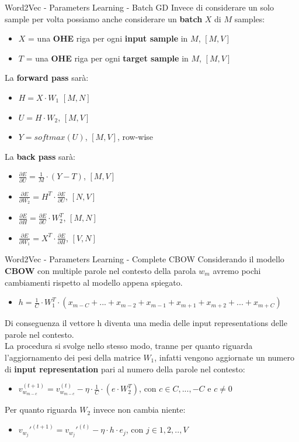 \documentclass[british]{beamer}
\begin{document}
\begin{frame}{Word2Vec - Parameters Learning - Batch GD}
	Invece di considerare un solo sample per volta possiamo anche considerare un \textbf{batch} \(X\) di \(M\) samples:
	\begin{itemize}
		\item \(X\) = una \textbf{OHE} riga per ogni \textbf{input sample} in \(M\), \([M,V]\)
		\item \(T\) = una \textbf{OHE} riga per ogni \textbf{target sample} in \(M\), \([M,V]\)
	\end{itemize}
	La \textbf{forward pass} sar\`{a}:
	\begin{itemize}
		\item \(H = X \cdot W_1\)  \([M,N]\)
		\item \(U = H \cdot W_2\),  \([M,V]\)
		\item \(Y = softmax(U)\),  \([M,V]\), row-wise
	\end{itemize}
	La \textbf{back pass} sar\`{a}:
	\begin{itemize}
		\item \( \frac{\partial E}{\partial U} = \frac{1}{M} \cdot \left( Y - T \right) \), \([M,V]\)
		\item \( \frac{\partial E}{\partial W_2} = H^T \cdot\frac{\partial E}{\partial U} \), \([N,V]\)
		\item \(\frac{\partial E}{\partial H} = \frac{\partial E}{\partial U} \cdot W_2^T \), \([M,N]\)
		\item \(\frac{\partial E}{\partial W_1} = X^T \cdot \frac{\partial E}{\partial H}\), \([V,N]\)
	\end{itemize}
\end{frame}

\begin{frame}{Word2Vec - Parameters Learning - Complete CBOW}
	Considerando il modello \textbf{CBOW} con multiple parole nel contesto della parola \(w_{m}\) avremo pochi cambiamenti rispetto al modello appena spiegato.
	\begin{itemize}
		\item \( h = \frac{1}{C} \cdot W_1^T \cdot \left(x_{m-C} + ... + x_{m-2} + x_{m-1} + x_{m+1} + x_{m+2} + ... + x_{m+C} \right)\)
	\end{itemize}
	Di conseguenza il vettore h diventa una media delle input representations delle parole nel contesto.\\
	La procedura si svolge nello stesso modo, tranne per quanto riguarda l'aggiornamento dei pesi della matrice \(W_1\), infatti vengono aggiornate un numero di \textbf{input representation} pari al numero della parole nel contesto:
	\begin{itemize}
		\item \( v_{w_{m-c}}^{(t+1)} = v_{w_{m-c}}^{(t)} - \eta\cdot \frac{1}{C} \cdot \left(e \cdot W_{2}^T\right)\), con \(c \in {C,...,-C} \) e \(c \neq 0\)
	\end{itemize}	
	Per quanto riguarda \(W_2\) invece non cambia niente:
	\begin{itemize}
		\item \( v_{w_{j}}'^{(t+1)} = v_{w_{j}}'^{(t)} - \eta\cdot h \cdot e_j\), con \(j \in {1,2,..,V}\)
	\end{itemize}
\end{frame}
\end{document}
